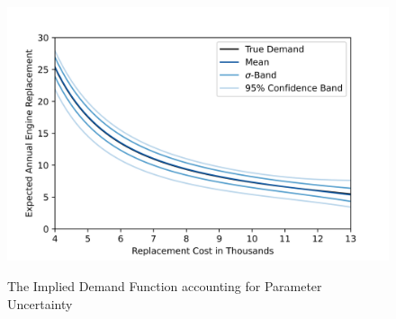 \begin{figure}[H]
	\caption{The Implied Demand Function accounting for Parameter Uncertainty}
	\vspace*{-4mm}
	\centering
	\includegraphics[scale=0.9]{../figures/figure_4.png}
	\label{figure4}
\end{figure}







